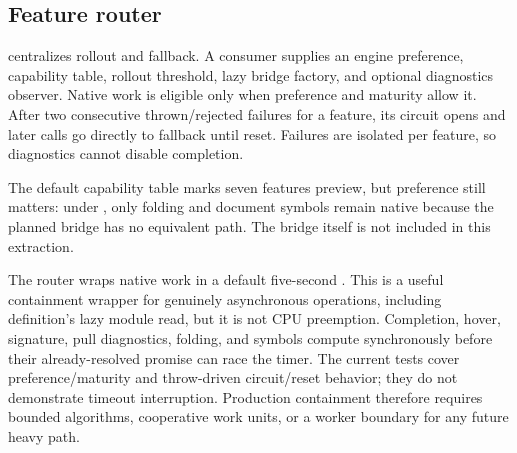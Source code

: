 \documentclass[11pt]{article}
\newcommand{\code}[1]{\texttt{\detokenize{#1}}}
\begin{document}
\subsection{Feature router}

 centralizes rollout and fallback. A consumer supplies an engine preference, capability table, rollout threshold, lazy bridge factory, and optional diagnostics observer. Native work is eligible only when preference and maturity allow it. After two consecutive thrown/rejected failures for a feature, its circuit opens and later calls go directly to fallback until reset. Failures are isolated per feature, so diagnostics cannot disable completion.

The default capability table marks seven features preview, but preference still matters: under \code{sqlToolsService}, only folding and document symbols remain native because the planned bridge has no equivalent path. The bridge itself is not included in this extraction.

The router wraps native work in a default five-second \code{Promise.race}. This is a useful containment wrapper for genuinely asynchronous operations, including definition's lazy module read, but it is not CPU preemption. Completion, hover, signature, pull diagnostics, folding, and symbols compute synchronously before their already-resolved promise can race the timer. The current tests cover preference/maturity and throw-driven circuit/reset behavior; they do not demonstrate timeout interruption. Production containment therefore requires bounded algorithms, cooperative work units, or a worker boundary for any future heavy path.
\end{document}
